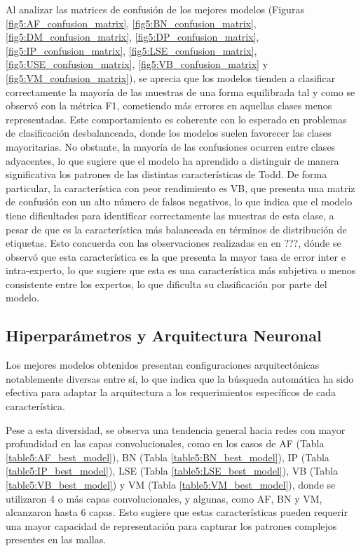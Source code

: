 Al analizar las matrices de confusión de los mejores modelos (Figuras \ref{fig5:AF_confusion_matrix}, \ref{fig5:BN_confusion_matrix}, \ref{fig5:DM_confusion_matrix}, \ref{fig5:DP_confusion_matrix}, \ref{fig5:IP_confusion_matrix}, \ref{fig5:LSE_confusion_matrix}, \ref{fig5:USE_confusion_matrix}, \ref{fig5:VB_confusion_matrix} y \ref{fig5:VM_confusion_matrix}), se aprecia que los modelos tienden a clasificar correctamente la mayoría de las muestras de una forma equilibrada tal y como se observó con la métrica F1, cometiendo más errores en aquellas clases menos representadas. Este comportamiento es coherente con lo esperado en problemas de clasificación desbalanceada, donde los modelos suelen favorecer las clases mayoritarias. No obstante, la mayoría de las confusiones ocurren entre clases adyacentes, lo que sugiere que el modelo ha aprendido a distinguir de manera significativa los patrones de las distintas características de Todd. De forma particular, la característica con peor rendimiento es VB, que presenta una matriz de confusión con un alto número de falsos negativos, lo que indica que el modelo tiene dificultades para identificar correctamente las muestras de esta clase, a pesar de que es la característica más balanceada en términos de distribución de etiquetas. Esto concuerda con las observaciones realizadas en en ???, dónde se observó que esta característica es la que presenta la mayor tasa de error inter e intra-experto, lo que sugiere que esta es una característica más subjetiva o menos consistente entre los expertos, lo que dificulta su clasificación por parte del modelo.

\subsection{Hiperparámetros y Arquitectura Neuronal}
Los mejores modelos obtenidos presentan configuraciones arquitectónicas notablemente diversas entre sí, lo que indica que la búsqueda automática ha sido efectiva para adaptar la arquitectura a los requerimientos específicos de cada característica.

Pese a esta diversidad, se observa una tendencia general hacia redes con mayor profundidad en las capas convolucionales, como en los casos de AF (Tabla \ref{table5:AF_best_model}), BN (Tabla \ref{table5:BN_best_model}), IP (Tabla \ref{table5:IP_best_model}), LSE (Tabla \ref{table5:LSE_best_model}), VB (Tabla \ref{table5:VB_best_model}) y VM (Tabla \ref{table5:VM_best_model}), donde se utilizaron 4 o más capas convolucionales, y algunas, como AF, BN y VM, alcanzaron hasta 6 capas. Esto sugiere que estas características pueden requerir una mayor capacidad de representación para capturar los patrones complejos presentes en las mallas.

